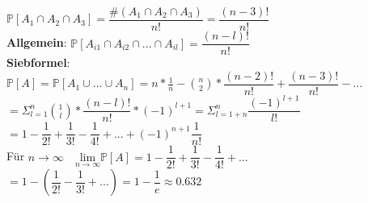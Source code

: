 $\mathds{P}[A_1\cap A_2\cap A_3]=\dfrac{\#(A_1 \cap A_2 \cap A_3)}{n!} = \dfrac{(n-3)!}{n!}$\medskip\\
\textbf{Allgemein}: $ \mathds{P}[A_{i1}\cap A_{i2}\cap...\cap A_{il}]=\dfrac{(n-l)!}{n!}$\smallskip\\
\textbf{Siebformel}: $\mathds{P}[A] = \mathds{P}[A_1\cup ... \cup A_n]= n * \frac{1}{n}- \binom{n}{2}*\dfrac{(n-2)!}{n!}+\dfrac{(n-3)!}{n!}-...$\medskip\\
$= \Sigma_{l=1}^n \binom{1}{l}*\dfrac{(n-l)!}{n!}*(-1)^{l+1}= \Sigma_{l=1+n}^n\dfrac{(-1)^{l+1}}{l!}$ \medskip\\
$=1-\dfrac{1}{2!}+\dfrac{1}{3!}-\dfrac{1}{4!}+...+(-1)^{n+1}\dfrac{1}{n!}$\medskip\\
Für $n\rightarrow\infty  \quad \underset{n\rightarrow\infty}{\text{lim}}\mathds{P}[A]= 1-\dfrac{1}{2!}+\dfrac{1}{3!}-\dfrac{1}{4!}+... $\smallskip\\
$= 1- (\dfrac{1}{2!}-\dfrac{1}{3!}+...)= 1 - \dfrac{1}{e} \approx 0.632$
